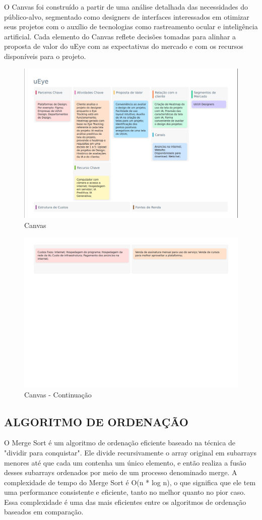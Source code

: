 O Canvas foi construído a partir de uma análise detalhada das necessidades do público-alvo, segmentado como designers de interfaces interessados em otimizar seus projetos com o auxílio de tecnologias como rastreamento ocular e inteligência artificial. Cada elemento do Canvas reflete decisões tomadas para alinhar a proposta de valor do uEye com as expectativas do mercado e com os recursos disponíveis para o projeto.

\begin{figure}[H]
    \centering
    \caption{Canvas}%
    \label{fig:pg-canvas1}
    \includegraphics[width=0.72\linewidth]{Illustrations/canvas1.png}
\end{figure}

\begin{figure}[H]
    \centering
    \caption{Canvas - Continuação}%
    \label{fig:pg-canvas2}
    \includegraphics[width=0.72\linewidth]{Illustrations/canvas2.png}
\end{figure}

\subsection*{ALGORITMO DE ORDENAÇÃO}
O Merge Sort é um algoritmo de ordenação eficiente baseado na técnica de "dividir para conquistar". Ele divide recursivamente o array original em subarrays menores até que cada um contenha um único elemento, e então realiza a fusão desses subarrays ordenados por meio de um processo denominado merge. A complexidade de tempo do Merge Sort é O(n * log n), o que significa que ele tem uma performance consistente e eficiente, tanto no melhor quanto no pior caso. Essa complexidade é uma das mais eficientes entre os algoritmos de ordenação baseados em comparação. \textcite{Brunet}

